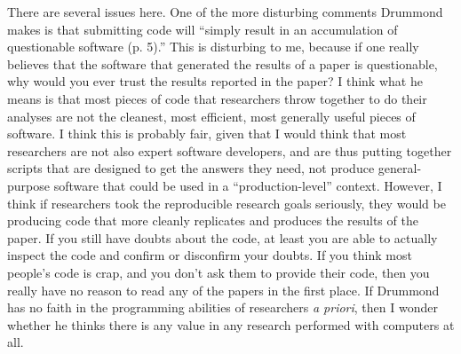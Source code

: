 \documentclass{book}
\begin{document}
There are several issues here.  One of the more disturbing comments Drummond makes is that submitting code will ``simply result in an accumulation of questionable software (p. 5).'' This is disturbing to me, because if one really believes that the software that generated the results of a paper is questionable, why would you ever trust the results reported in the paper?  I think what he means is that most pieces of code that researchers throw together to do their analyses are not the cleanest, most efficient, most generally useful pieces of software.  I think this is probably fair, given that I would think that most researchers are not also expert software developers, and are thus putting together scripts that are designed to get the answers they need, not produce general-purpose software that could be used in a ``production-level'' context. However, I think if researchers took the reproducible research goals seriously, they would be producing code that more cleanly replicates and produces the results of the paper.  If you still have doubts about the code, at least you are able to actually inspect the code and confirm or disconfirm your doubts. If you think most people's code is crap, and you don't ask them to provide their code, then you really have no reason to read any of the papers in the first place. If Drummond has no faith in the programming abilities of researchers \emph{a priori}, then I wonder whether he thinks there is any value in any research performed with computers at all.
\end{document}
